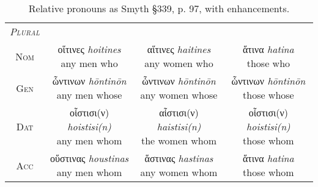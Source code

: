 \documentclass[10pt]{memoir}
\newcommand{\tsc}[1]{\textsc{#1}}
\newcommand{\grc}[1]{\fontspec{Inter}#1}
\newcommand{\trc}[1]{\textit{\fontspec{Tinos}#1}}
\begin{document}
\begin{table}[H]
\begin{tabular}{c|ccc}
            \hline
            \emph{\tsc{Plural}} \\
            \tsc{Nom} & \makecell{\grc{οἵτινες} \trc{hoitines} \\ \small any men who} & \makecell{\grc{αἵτινες} \trc{haitines} \\ \small any women who} & \makecell{\grc{ἅτινα} \trc{hatina} \\ \small those who} \\
            \tsc{Gen} & \makecell{\grc{ὧντινων} \trc{hōntinōn} \\ \small any men whose} & \makecell{\grc{ὧντινων} \trc{hōntinōn} \\ \small any women whose} & \makecell{\grc{ὧντινων} \trc{hōntinōn} \\ \small those whose} \\
            \tsc{Dat} & \makecell{\grc{οἷστισι(ν)} \trc{hoistisi(n)} \\ \small any men whom} & \makecell{\grc{αἷστισι(ν)} \trc{haistisi(n)}\\ \small the women whom} & \makecell{\grc{οἷστισι(ν)} \trc{hoistisi(n)} \\ \small those whom} \\
            \tsc{Acc} & \makecell{\grc{οὕστινας} \trc{houstinas} \\ \small any men whom} & \makecell{\grc{ἅστινας} \trc{hastinas} \\ \small any women whom} & \makecell{\grc{ἅτινα} \trc{hatina} \\ \small those whom} \\
        \end{tabular}
        \caption{Relative pronouns as Smyth §339, p. 97, with enhancements.}
    \end{table}
\end{document}
